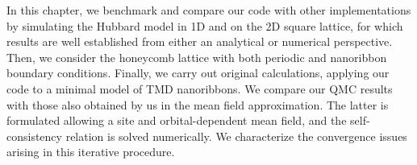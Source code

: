 
\label{cap:applications}

\slshape

In this chapter, we benchmark and compare our code with other implementations by simulating the Hubbard model in \acs{1D} and on the \acs{2D} square lattice, for which results are well established from either an analytical or numerical perspective.
Then, we consider the honeycomb lattice with both periodic and nanoribbon boundary conditions.
Finally, we carry out original calculations, applying our code to a minimal model of \acs{TMD} nanoribbons.
We compare our \acs{QMC} results with those also obtained by us in the mean field approximation.
The latter is formulated allowing a site and orbital-dependent mean field, and the self-consistency relation is solved numerically.
We characterize the convergence issues arising in this iterative procedure.

\normalfont





\cleardoublepage
